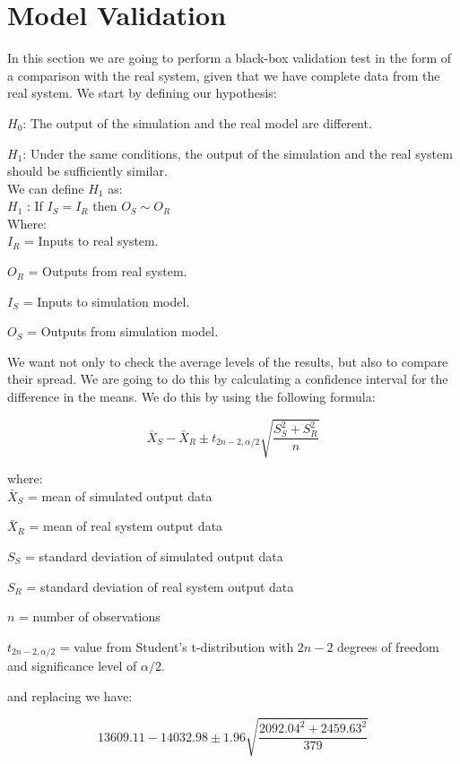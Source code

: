 \documentclass[11pt, oneside]{article}   	%
\begin{document}
\section{Model Validation}
In this section we are going to perform a black-box validation test in the form of a comparison with the real system, given that we have complete data from the real system. We start by defining our hypothesis:

$H_0$: The output of the simulation and the real model are different.

$H_1$: Under the same conditions, the output of the simulation and the real system should be sufficiently similar.\\

We can define $H_1$ as:\\

$H_1$ : If $I_S = I_R$ then $O_S \sim O_R$\\

Where:\\

$I_R$ = Inputs to real system.

$O_R$ = Outputs from real system.

$I_S$ = Inputs to simulation model.

$O_S$ = Outputs from simulation model.

We want not only to check the average levels of the results, but also to compare their spread. We are going to do this by calculating a confidence interval for the difference in the means. We do this by using the following formula:

$$\bar{X}_S - \bar{X}_R \pm t_{2n - 2, \alpha/2} \sqrt{\dfrac{S^2_S + S^2_R}{n}}$$

where:\\

$\bar{X}_S$ = mean of simulated output data

$\bar{X}_R$ = mean of real system output data

$S_S$ = standard deviation of simulated output data

$S_R$ = standard deviation of real system output data

$n$ = number of observations 

$t_{2n - 2, \alpha/2}$ = value from Student's t-distribution with $2n-2$ degrees of freedom and significance level of $\alpha/2$.

and replacing we have:

$$13609.11 - 14032.98 \pm 1.96 \sqrt{\dfrac{2092.04^2 + 2459.63^2}{379}}$$
\end{document}
